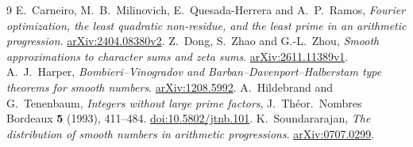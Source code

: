 \documentclass[11pt]{article}
\begin{document}
\begin{thebibliography}{9}
 E.~Carneiro, M.~B.~Milinovich, E.~Quesada-Herrera and
A.~P.~Ramos, \emph{Fourier optimization, the least quadratic non-residue,
and the least prime in an arithmetic progression}.
\href{https://arxiv.org/pdf/2404.08380v2}{arXiv:2404.08380v2}.
 Z.~Dong, S.~Zhao and G.-L.~Zhou,
\emph{Smooth approximations to character sums and zeta sums}.
\href{https://arxiv.org/pdf/2611.11389v1}{arXiv:2611.11389v1}.
 A.~J.~Harper, \emph{Bombieri--Vinogradov and
Barban--Davenport--Halberstam type theorems for smooth numbers}.
\href{https://arxiv.org/pdf/1208.5992}{arXiv:1208.5992}.
 A.~Hildebrand and G.~Tenenbaum, \emph{Integers without
large prime factors}, J.~Th\'eor.\ Nombres Bordeaux \textbf{5} (1993),
411--484. \href{https://jtnb.centre-mersenne.org/articles/10.5802/jtnb.101/}{doi:10.5802/jtnb.101}.
 K.~Soundararajan, \emph{The distribution of smooth
numbers in arithmetic progressions}.
\href{https://arxiv.org/pdf/0707.0299}{arXiv:0707.0299}.
\end{thebibliography}
\end{document}
